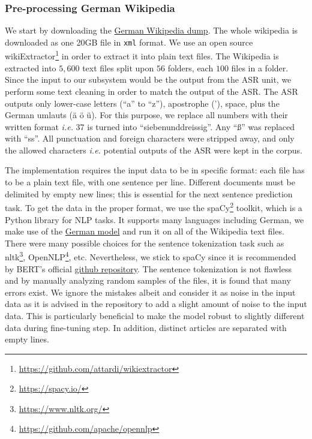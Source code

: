 \subsubsection{Pre-processing German Wikipedia}
We start by downloading the \href{https://dumps.wikimedia.org/dewiki/latest/dewiki-latest-pages-articles.xml.bz2}{German Wikipedia dump}. The whole wikipedia is downloaded as one 20GB file in \texttt{xml} format. We use an open source wikiExtractor\footnote{\url{https://github.com/attardi/wikiextractor}} in order to extract it into plain text files. The Wikipedia is extracted into $5,600$ text files split upon $56$ folders, each $100$ files in a folder. Since the input to our subsystem would be the output from the \ac{ASR} unit, we perform some text cleaning in order to match the output of the \ac{ASR}. The \ac{ASR} outputs only lower-case letters (\enquote{a} to \enquote{z}), apostrophe ('), space, plus the German umlauts ({\"a} {\"o} {\"u}). For this purpose, we replace all numbers with their written format \textit{i.e.} 37 is turned into \enquote{siebenunddreissig}. Any \enquote{\ss} was replaced with \enquote{ss}. All punctuation and foreign characters were stripped away, and only the allowed characters \textit{i.e.} potential outputs of the \ac{ASR} were kept in the corpus.


The implementation requires the input data to be in specific format: each file has to be a plain text file, with one sentence per line. Different documents must be delimited by empty new lines; this is essential for the next sentence prediction task.
To get the data in the proper format, we use the spaCy\footnote{\url{https://spacy.io/}} toolkit, which is a Python library for \ac{NLP} tasks. It supports many languages including German, we make use of the \href{https://spacy.io/models/de}{German model} and run it on all of the Wikipedia text files. There were many possible choices for the sentence tokenization task such as nltk\footnote{\url{https://www.nltk.org/}}, OpenNLP\footnote{\url{https://github.com/apache/opennlp}}, etc. Nevertheless, we stick to spaCy since it is recommended by \ac{BERT}'s official \href{https://github.com/google-research/bert}{github repository}. The sentence tokenization is not flawless and by manually analyzing random samples of the files, it is found that many errors exist. We ignore the mistakes albeit and consider it as noise in the input data as it is advised in the repository to add a slight amount of noise to the input data. This is particularly beneficial to make the model robust to slightly different data during fine-tuning step. In addition, distinct articles are separated with empty lines.

